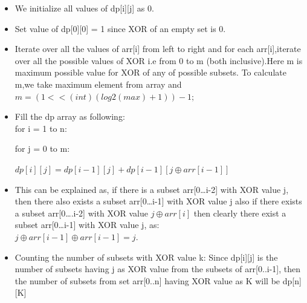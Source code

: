 \documentclass[conference]{IEEEtran}
\begin{document}
\begin{itemize}
\item We initialize all values of dp[i][j] as 0.
\item Set value of dp[0][0] = 1 since XOR of an empty set is 0.
\item Iterate over all the values of arr[i] from left to right and for each arr[i],iterate over all the possible values of XOR i.e from 0 to m (both inclusive).Here m is maximum possible value for XOR of any of possible subsets.
To calculate m,we take maximum element from array and \\
\quad $m = (1 << (int)(log2(max) + 1) ) - 1;$
\item Fill the dp array as following:\\ 
       for i = 1 to n:
       
           \quad for j = 0 to m:
          
             \quad \quad $dp[i][j] = dp[i-1][j] + dp[i-1][j {\oplus} arr[i-1]]$\\
                   
\item This can be explained as, if there is a subset arr[0…i-2] with XOR value j, then there also exists a subset arr[0…i-1] with XOR value j also if there exists a subset arr[0….i-2] with XOR value $j \oplus arr[i]$ then clearly there exist a subset arr[0…i-1] with XOR value j, as:\\
$j \oplus arr[i-1] \oplus arr[i-1] = j$.\\

\item Counting the number of subsets with XOR value k: Since dp[i][j] is the number of subsets having j as XOR value from the subsets of arr[0..i-1], then the number of subsets from set arr[0..n] having XOR value as K will be dp[n][K]
\end{itemize}
\end{document}
